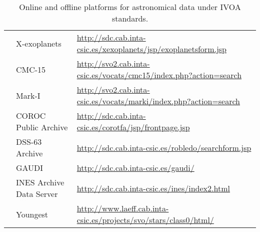 \begin{table*}[h!t]
\begin{tabular}{|l|p{9cm}|p{6cm}|}
    \\
    \cline{2-3}
    & X-exoplanets
    & \url{http://sdc.cab.inta-csic.es/xexoplanets/jsp/exoplanetsform.jsp} \\
    \cline{2-3}
    & CMC-15
    & \url{http://svo2.cab.inta-csic.es/vocats/cmc15/index.php?action=search} \\
    \cline{2-3}
    & Mark-I
    & \url{http://svo2.cab.inta-csic.es/vocats/marki/index.php?action=search} \\
    \cline{2-3}
    & COROC Public Archive
    & \url{http://sdc.cab.inta-csic.es/corotfa/jsp/frontpage.jsp} \\
    \cline{2-3}
    & DSS-63 Archive
    & \url{http://sdc.cab.inta-csic.es/robledo/searchform.jsp} \\
    \cline{2-3}
    & GAUDI
    & \url{http://sdc.cab.inta-csic.es/gaudi/} \\
    \cline{2-3}
    & INES Archive Data Server
    & \url{http://sdc.cab.inta-csic.es/ines/index2.html} \\
    \cline{2-3}
    & Youngest
    & \url{http://www.laeff.cab.inta-csic.es/projects/svo/stars/class0/html/} \\
    \hline
    \end{tabular}
    \caption{Online and offline platforms for astronomical data under IVOA standards.}
    \label{table:vo_platforms}
\end{table*}
